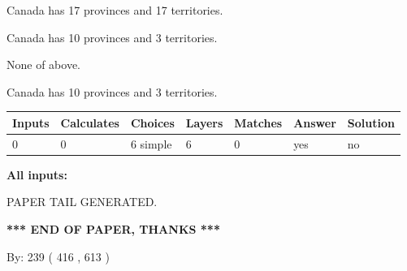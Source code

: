 \documentclass[12pt]{article}
\begin{document}
 
Canada has  17 provinces and  17 territories.
 
 
Canada has 10  provinces and 3 territories.
 
 
 None of above.
 
 
\noindent{}
 
 
Canada has 10  provinces and 3 territories.
 
 
\noindent{}
 
 
   
   
   
   
\noindent\begin{tabular}{|l|l|l|l|l|l|l|}
 \hline
Inputs & Calculates & Choices & Layers & Matches & Answer & Solution \\ \hline
 0  & 
 0  & 
 6
  simple  
  & 
 6  & 
 0  & 
  yes & 
  no 
  \\ \hline
 \end{tabular}
   
   
   
   
\noindent{}
   
   
   
   
\noindent\vspace{0.1in}\hspace{-0.08in} {\textbf{\Large{All inputs: }}}
   
   
   
   
   
   
 \vspace{0.2in}
 
   
   
\vspace{2.0in} PAPER TAIL GENERATED.
   
   
   
   
\vspace{1.0in} 
{\textbf{\large{ *** END OF PAPER, THANKS *** }}} 
   
   
\hspace{1.0in} By: 
 239 ( 416 ,  613 )
   
   
   
   
\newpage 
\setcounter{page}{ 
   575001 } 
   
   
   
\end{document}
